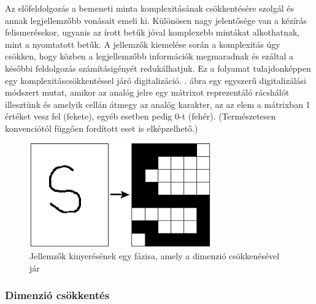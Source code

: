 Az előfeldolgozás a bemeneti minta komplexitásának csökkentésére szolgál és annak legjellemzőbb vonásait emeli ki. Különösen nagy jelentősége van a kézírás felismerésekor, ugyanis az írott betűk jóval komplexebb mintákat alkothatnak, mint a nyomtatott betűk. A jellemzők kiemelése során a komplexitás úgy csökken, hogy közben a legjellemzőbb információk megmaradnak és ezáltal a későbbi feldolgozás számításigényét redukálhatjuk. Ez a folyamat tulajdonképpen egy komplexitáscsökkentéssel járó digitalizáció. . ábra egy egyszerű digitalizálási módszert mutat, amikor az analóg jelre egy mátrixot reprezentáló rácshálót illesztünk és amelyik cellán átmegy az analóg karakter, az az elem a mátrixban 1 értéket vesz fel (fekete), egyéb esetben pedig 0-t (fehér). (Természetesen konvenciótól függően fordított eset is elképzelhető.)

\begin{figure}[h]
\centering
\includegraphics[scale=0.65]{images/ocr_preprocess}
\caption{Jellemzők kinyerésének egy fázisa, amely a dimenzió csökkenésével jár}
\label{fig:ocr_preprocess}
\end{figure}

\subsubsection{Dimenzió csökkentés}

